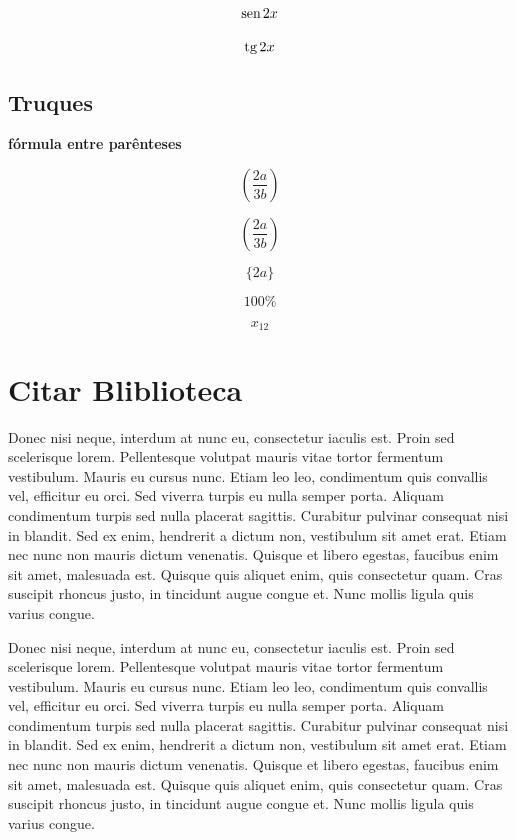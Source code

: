 \documentclass[12pt]{article}
\renewcommand{\sin}{\mathrm{sen\hspace{0.5mm}}}
\renewcommand{\tan}{\mathrm{tg\hspace{0.5mm}}}
\begin{document}
\begin{equation}
\sin{2x}
\end{equation}

\begin{equation}
	\tan{2x}
\end{equation}

\subsection[Truques]{Truques}

\textbf{fórmula entre parênteses}

\begin{equation}
	(\frac{2a}{3b})
\end{equation}

\begin{equation}
	\left(\frac{2a}{3b}\right)
\end{equation}

\begin{equation}
\{2a\}
\end{equation}

\begin{equation}
	100\%
\end{equation}

\begin{equation}
	x_{12}
\end{equation}

\newpage
\section{Citar Bliblioteca}
Donec nisi neque, interdum at nunc eu, consectetur iaculis est. Proin sed scelerisque lorem. Pellentesque volutpat mauris vitae tortor fermentum vestibulum. Mauris eu cursus nunc. Etiam leo leo, condimentum quis convallis vel, efficitur eu orci. Sed viverra turpis eu nulla semper porta. Aliquam condimentum turpis sed nulla placerat sagittis. Curabitur pulvinar consequat nisi in blandit. Sed ex enim, hendrerit a dictum non, vestibulum sit amet erat. Etiam nec nunc non mauris dictum venenatis. Quisque et libero egestas, faucibus enim sit amet, malesuada est. Quisque quis aliquet enim, quis consectetur\cite{Martin2017-xe} quam. Cras suscipit rhoncus justo, in tincidunt augue congue et. Nunc mollis ligula quis varius congue.

Donec nisi neque, interdum at nunc eu, consectetur iaculis est. Proin sed scelerisque lorem. Pellentesque volutpat mauris vitae tortor fermentum vestibulum. Mauris eu cursus nunc. Etiam leo leo, condimentum quis convallis vel, efficitur eu orci. Sed viverra turpis eu nulla semper porta. Aliquam condimentum turpis sed nulla placerat sagittis. Curabitur pulvinar consequat nisi in blandit. Sed ex enim, hendrerit a dictum non, vestibulum sit amet erat. Etiam nec nunc non mauris dictum venenatis. Quisque et libero egestas, faucibus enim sit amet, malesuada est. Quisque quis aliquet enim, quis consectetur quam. Cras suscipit rhoncus justo, in tincidunt augue congue et. Nunc mollis ligula quis varius congue.
\end{document}
